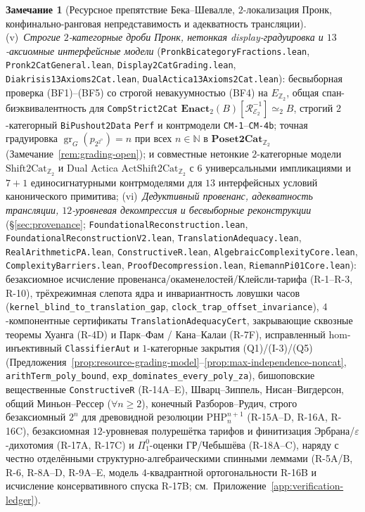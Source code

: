 \documentclass[11pt]{article}
\theoremstyle{plain}
\theoremstyle{definition}
\newtheorem{remark}[theorem]{Замечание}
\newcommand{\cE}{\mathcal{E}}
\newcommand{\gr}{\operatorname{gr}}
\begin{document}
\begin{remark}[Ресурсное препятствие Бека--Шевалле, $2$-локализация Пронк, конфинально-ранговая непредставимость и адекватность трансляции]
(v)~\emph{Строгие $2$-категорные дроби Пронк, нетонкая display-градуировка и $13$-аксиомные интерфейсные модели} (\texttt{PronkBicategoryFractions.lean}, \texttt{Pronk2CatGeneral.lean}, \texttt{Display2CatGrading.lean}, \texttt{Diakrisis13Axioms2Cat.lean}, \texttt{DualActica13Axioms2Cat.lean}): бесвыборная проверка (BF1)--(BF5) со строгой невакуумностью (BF4) на $E_{\mathbb{Z}_2}$, общая спан-биэквивалентность для \texttt{CompStrict2Cat} $\mathbf{Enact}_2(B)[\mathcal{R}_{\cE_2}^{-1}] \simeq_2 B$, строгий $2$-категорный \texttt{BiPushout2Data} \texttt{Perf} и контрмодели \texttt{CM-1}--\texttt{CM-4b}; точная градуировка $\gr_G(p_{2^{2^n}}) = n$ при всех $n \in \mathbb{N}$ в $\mathbf{Poset2Cat}_{\mathbb{Z}_2}$ (Замечание~\ref{rem:grading-open}); и совместные нетонкие $2$-категорные модели $\mathrm{Shift2Cat}_{\mathbb{Z}_2}$ и Dual Actica $\mathrm{ActShift2Cat}_{\mathbb{Z}_2}$ с $6$ универсальными импликациями и $7+1$ единосигнатурными контрмоделями для $13$ интерфейсных условий канонического примитива;
(vi)~\emph{Дедуктивный провенанс, адекватность трансляции, $12$-уровневая декомпрессия и бесвыборные реконструкции} (\S\ref{sec:provenance}; \texttt{Foundational\allowbreak Reconstruction.lean}, \texttt{Foundational\allowbreak ReconstructionV2.lean}, \texttt{Translation\allowbreak Adequacy.lean}, \texttt{RealArithmeticPA.lean}, \texttt{ConstructiveR.lean}, \texttt{Algebraic\allowbreak ComplexityCore.lean}, \texttt{Complexity\allowbreak Barriers.lean}, \texttt{Proof\allowbreak Decompression.lean}, \texttt{Riemann\allowbreak Pi01Core.lean}): безаксиомное исчисление провенанса/окаменелостей/Клейсли-тарифа (R-1--R-3, R-10), трёхрежимная слепота ядра и инвариантность ловушки часов (\texttt{kernel\_\allowbreak blind\_\allowbreak to\_\allowbreak translation\_\allowbreak gap}, \texttt{clock\_\allowbreak trap\_\allowbreak offset\_\allowbreak invariance}), $4$-компонентные сертификаты \texttt{TranslationAdequacyCert}, закрывающие сквозные теоремы Хуанга (R-4D) и Парк--Фам / Кана--Калаи (R-7F), исправленный hom-инъективный \texttt{ClassifierAut} и $1$-категорные закрытия (Q1)/(I-3)/(Q5) (Предложения~\ref{prop:resource-grading-model}--\ref{prop:max-independence-noncat}, \texttt{arithTerm\_\allowbreak poly\_\allowbreak bound}, \texttt{exp\_\allowbreak dominates\_\allowbreak every\_\allowbreak poly\_\allowbreak za}), бишоповские вещественные \texttt{ConstructiveR} (R-14A--E), Шварц--Зиппель, Нисан--Вигдерсон, общий Миньон--Рессер ($\forall n \ge 2$), конечный Разборов--Рудич, строго безаксиомный $2^n$ для древовидной резолюции $\mathrm{PHP}_n^{n+1}$ (R-15A--D, R-16A, R-16C), безаксиомная $12$-уровневая полурешётка тарифов и финитизация Эрбрана/$\varepsilon$-дихотомия (R-17A, R-17C) и $\Pi^0_1$-оценки ГР/Чебышёва (R-18A--C), наряду с честно отделёнными структурно-алгебраическими спинными леммами (R-5A/B, R-6, R-8A--D, R-9A--E, модель $4$-квадрантной ортогональности R-16B и исчисление консервативного спуска R-17B; см.\ Приложение~\ref{app:verification-ledger}).
\end{remark}
\end{document}
